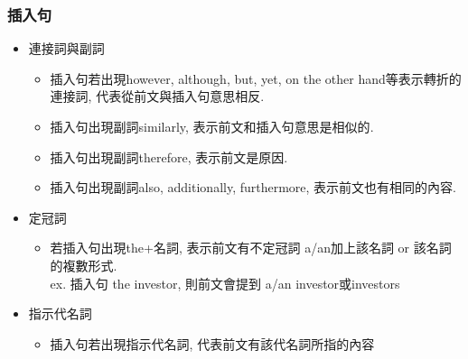 \documentclass{beamer}
\begin{document}
{\begin{CJK*}{UTF8}{bkai}
\begin{frame}
\frametitle{插入句}
\begin{itemize}
\item 連接詞與副詞
 \begin{itemize}
 \item 插入句若出現{\color{red}however}, {\color{red}although}, {\color{red}but}, {\color{red}yet}, {\color{red}on the other hand}等表示轉折的連接詞, 代表從前文與插入句意思相反.
 \item 插入句出現副詞{\color{red}similarly}, 表示前文和插入句{\color{red}意思是相似的}.
 \item 插入句出現副詞therefore, 表示前文是原因.
 \item 插入句出現副詞also, additionally, furthermore, 表示前文也有相同的內容.
 \end{itemize}
\item 定冠詞
 \begin{itemize}
 \item 若插入句出現the+名詞, 表示前文有不定冠詞 a/an加上該名詞 or 該名詞的複數形式.\\
 ex. 插入句 the investor, 則前文會提到 a/an investor或investors
 \end{itemize}
\item 指示代名詞
 \begin{itemize}
 \item 插入句若出現指示代名詞, 代表前文有該代名詞所指的內容
 \end{itemize}
\end{itemize}
\end{frame}
\end{CJK*}
}
\end{document}
